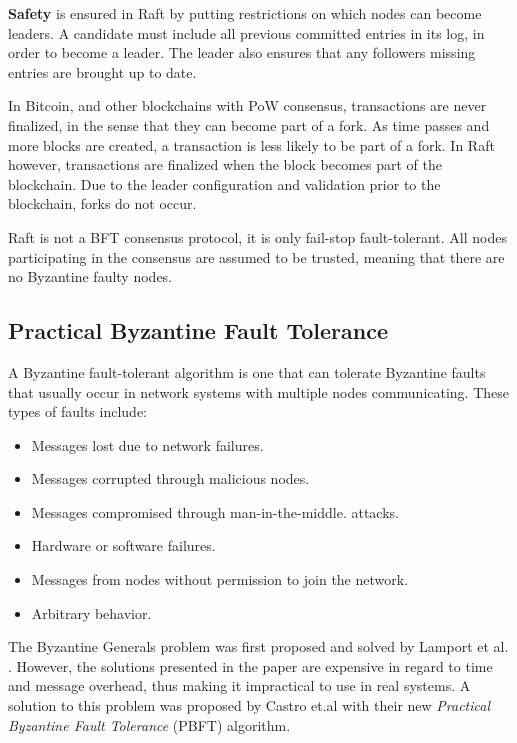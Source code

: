 \textbf{Safety} is ensured in Raft by putting restrictions on which nodes can become leaders. A candidate must include all previous committed entries in its log, in order to become a leader. The leader also ensures that any followers missing entries are brought up to date. 

In Bitcoin, and other blockchains with PoW consensus, transactions are never finalized, in the sense that they can become part of a fork. As time passes and more blocks are created, a transaction is less likely to be part of a fork. In Raft however, transactions are finalized when the block becomes part of the blockchain. Due to the leader configuration and validation prior to the blockchain, forks do not occur. 

Raft is not a BFT consensus protocol, it is only fail-stop fault-tolerant. All nodes participating in the consensus are assumed to be trusted, meaning that there are no Byzantine faulty nodes. 


\subsection{Practical Byzantine Fault Tolerance} 

A Byzantine fault-tolerant algorithm is one that can tolerate Byzantine faults that usually occur in network systems with multiple nodes communicating. These types of faults include:

\begin{itemize}
\item Messages lost due to network failures.
\item Messages corrupted through malicious nodes.
\item Messages compromised through man-in-the-middle. attacks.
\item Hardware or software failures.
\item Messages from nodes without permission to join the network.
\item Arbitrary behavior.
\end{itemize}

The Byzantine Generals problem was first proposed and solved by Lamport et al. \cite{byzantine_lamport}. However, the solutions presented in the paper are expensive in regard to time and message overhead, thus making it impractical to use in real systems. A solution to this problem was proposed by Castro et.al \cite{pbft} with their new \textit{Practical Byzantine Fault Tolerance} (PBFT) algorithm.


